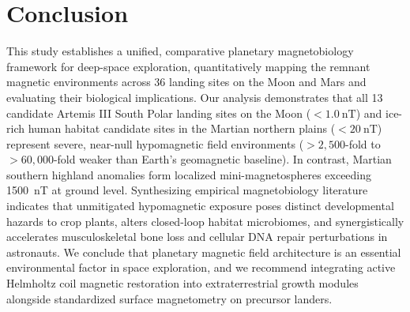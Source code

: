 \section{Conclusion}
\label{sec:conclusion}

This study establishes a unified, comparative planetary magnetobiology framework for deep-space exploration, quantitatively mapping the remnant magnetic environments across 36 landing sites on the Moon and Mars and evaluating their biological implications. Our analysis demonstrates that all 13 candidate Artemis III South Polar landing sites on the Moon ($< \SI{1.0}{\nano\tesla}$) and ice-rich human habitat candidate sites in the Martian northern plains ($< \SI{20}{\nano\tesla}$) represent severe, near-null hypomagnetic field environments ($>2,500$-fold to $>60,000$-fold weaker than Earth's geomagnetic baseline). In contrast, Martian southern highland anomalies form localized mini-magnetospheres exceeding \SI{1500}{\nano\tesla} at ground level. Synthesizing empirical magnetobiology literature indicates that unmitigated hypomagnetic exposure poses distinct developmental hazards to crop plants, alters closed-loop habitat microbiomes, and synergistically accelerates musculoskeletal bone loss and cellular DNA repair perturbations in astronauts. We conclude that planetary magnetic field architecture is an essential environmental factor in space exploration, and we recommend integrating active Helmholtz coil magnetic restoration into extraterrestrial growth modules alongside standardized surface magnetometry on precursor landers.

